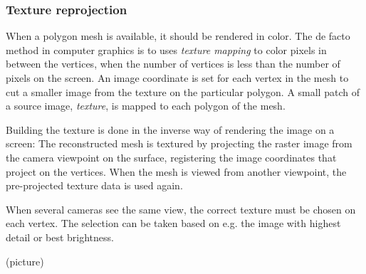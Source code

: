 

\subsubsection{Texture reprojection} %

When a polygon mesh is available, it should be rendered in color.
The de facto method in computer graphics is to uses \emph{texture mapping} to color pixels in between the vertices, when the number of vertices is less than the number of pixels on the screen.
An image coordinate is set for each vertex in the mesh to cut a smaller image from the texture on the particular polygon.
A small patch of a source image, \emph{texture}, is mapped to each polygon of the mesh.

Building the texture is done in the inverse way of rendering the image on a screen:
The reconstructed mesh is textured by projecting the raster image from the camera viewpoint on the surface, registering the image coordinates that project on the vertices.
When the mesh is viewed from another viewpoint, the pre-projected texture data is used again.

When several cameras see the same view, the correct texture must be chosen on each vertex.
The selection can be taken based on e.g. the image with highest detail or best brightness.


(picture)


%
%
%
%
%

